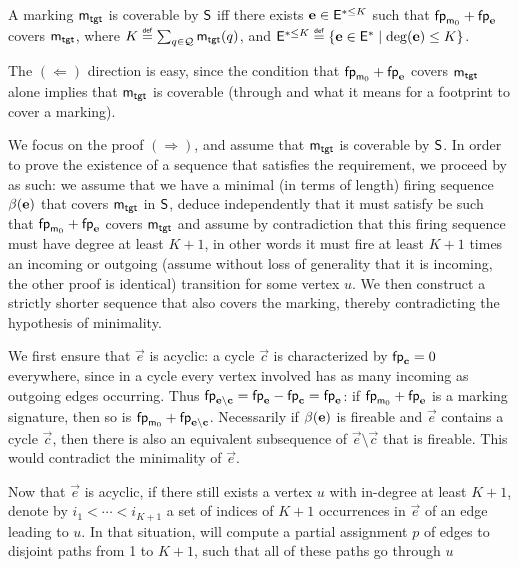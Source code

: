 \begin{lemmaE}[][category=proofs] \label{lem:cover-soft-cap}
  A marking $\mathsf{m}_\mathsf{tgt}$ is coverable by $\mathsf{S}$ iff there exists
  $\mathbf{e} \in \mathsf{E}^{*\leq K}$ such that $\mathsf{fp}_{\mathsf{m}_0} +
  \mathsf{fp}_{\mathbf{e}}$ covers $\mathsf{m}_\mathsf{tgt}$, where $K \stackrel{\scriptscriptstyle{\mathsf{def}}}{=} \sum_{q \in
    \mathcal{Q}} \mathsf{m}_\mathsf{tgt}(q)$, and $\mathsf{E}^{*\leq K} \stackrel{\scriptscriptstyle{\mathsf{def}}}{=}
  {\{ {\mathbf{e} \in \mathsf{E}^* \mid \deg(\mathbf{e}) \leq K} \}}$.
\end{lemmaE}
\begin{proofE}
  The $(\Leftarrow)$ direction is easy, since the condition that
  $\mathsf{fp}_{\mathsf{m}_0} + \mathsf{fp}_{\mathbf{e}}$ covers $\mathsf{m}_\mathsf{tgt}$
  alone implies that $\mathsf{m}_\mathsf{tgt}$ is coverable (through 
  and what it means for a footprint to cover a marking).

  We focus on the proof $(\Rightarrow)$, and assume that $\mathsf{m}_\mathsf{tgt}$ is coverable by $\mathsf{S}$.
  In order to prove the existence of a sequence that satisfies the requirement,
  we proceed by as such: we assume that we have a minimal (in terms of length)
  firing sequence $\beta({\mathbf{e}})$ that covers $\mathsf{m}_\mathsf{tgt}$ in $\mathsf{S}$,
  deduce independently that it must satisfy be such that
  $\mathsf{fp}_{\mathsf{m}_0} + \mathsf{fp}_{\mathbf{e}}$ covers $\mathsf{m}_\mathsf{tgt}$
  and assume by contradiction that this firing sequence must
  have degree at least $K+1$, in other words it must
  fire at least $K+1$ times an incoming or outgoing
  (assume without loss of generality that it is incoming, the other proof is identical)
  transition for some vertex $u$.
  We then construct a strictly shorter sequence that also covers
  the marking, thereby contradicting the hypothesis of minimality.

  We first ensure that $\vec{e}$ is acyclic:
  a cycle $\vec{c}$ is characterized by $\mathsf{fp}_{\mathbf{c}} = 0$ everywhere,
  since in a cycle every vertex involved has as many incoming as outgoing edges occurring.
  Thus $\mathsf{fp}_{\mathbf{e} \setminus \mathbf{c}} = \mathsf{fp}_{\mathbf{e}} - \mathsf{fp}_{\mathbf{c}} = \mathsf{fp}_{\mathbf{e}}$:
  if $\mathsf{fp}_{\mathsf{m}_0} + \mathsf{fp}_{\mathbf{e}}$ is a marking signature,
  then so is $\mathsf{fp}_{\mathsf{m}_0} + \mathsf{fp}_{\mathbf{e} \setminus \mathbf{c}}$.
  Necessarily if $\beta({\mathbf{e}})$ is fireable and $\vec{e}$ contains a cycle $\vec{c}$,
  then there is also an equivalent subsequence of $\vec{e} \setminus \vec{c}$
  that is fireable. This would contradict the minimality of $\vec{e}$.

  Now that $\vec{e}$ is acyclic, if there still exists a vertex $u$
  with in-degree at least $K+1$,
  denote by $i_1 < \cdots < i_{K+1}$ a set of indices of $K+1$ occurrences
  in $\vec{e}$ of an edge leading to $u$.
  In that situation,  will compute a partial assignment
  $p$ of edges to disjoint paths from 1 to $K+1$, such that
  all of these paths go through $u$


\end{proofE}

